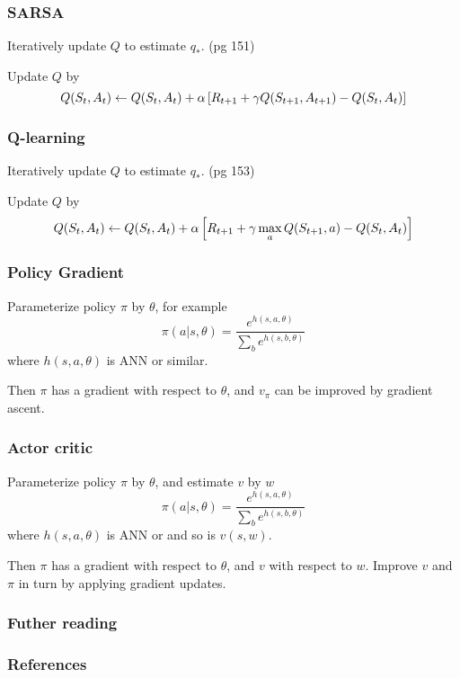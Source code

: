 \documentclass{beamer}
\begin{document}
\frame
{
   \frametitle{SARSA}
   Iteratively update $Q$ to estimate $q_*$. (pg 151)   
   
   Update $Q$ by
   $$Q(S_t,A_t) \leftarrow Q(S_t, A_t) + \alpha \left[{R_{t+1} + \gamma Q(S_{t+1}, A_{t+1}) - Q(S_t,A_t)}\right]$$
}

\frame
{
   \frametitle{Q-learning}
   Iteratively update $Q$ to estimate $q_*$. (pg 153)   
   
   Update $Q$ by
   $$Q(S_t,A_t) \leftarrow Q(S_t, A_t) + \alpha \left[{R_{t+1} + \gamma \max_a Q(S_{t+1}, a) - Q(S_t,A_t)}\right]$$
}

\frame
{
   \frametitle{Policy Gradient}
   Parameterize policy $\pi$ by $\theta$, for example
   $$\pi(a|s, \theta) = \frac{e^{h(s, a, \theta)}}{\sum_b e^{h(s, b, \theta)}}$$
   where $h(s, a, \theta)$ is ANN or similar.

   Then $\pi$ has a gradient with respect to $\theta$, and $v_\pi$ can be 
   improved by gradient ascent.
}

\frame
{
   \frametitle{Actor critic}
   Parameterize policy $\pi$ by $\theta$, and estimate $v$ by $w$
   $$\pi(a|s, \theta) = \frac{e^{h(s, a, \theta)}}{\sum_b e^{h(s, b, \theta)}}$$
   where $h(s, a, \theta)$ is ANN or and so is $v(s, w)$.

   Then $\pi$ has a gradient with respect to $\theta$, and $v$ with respect to
   $w$. Improve $v$ and $\pi$ in turn by applying gradient updates.
}

\frame
{
   \frametitle{Futher reading}
   \cite{sutton1998reinforcement}
   
   \cite{narasimhan2015language}
   
   \cite{li2016deep}
   
   \cite{mnih2015human}
   
   \cite{zhu2016target}
}

\begin{frame}[t,allowframebreaks]
\frametitle{References}
\printbibliography
\end{frame}
\end{document}
